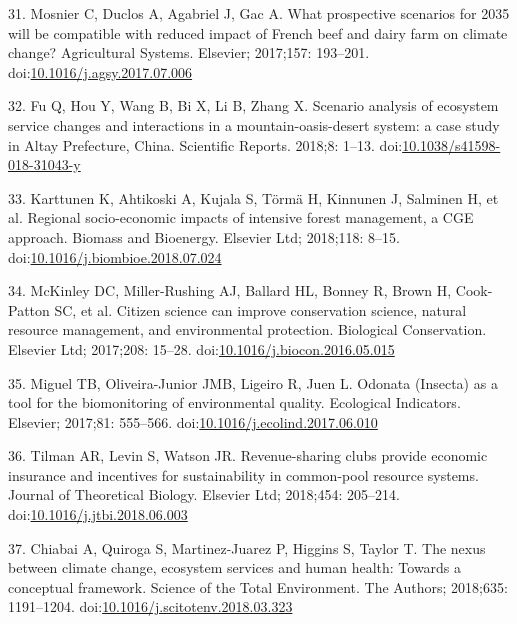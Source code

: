 \documentclass[10pt,letterpaper]{article}
\begin{document}
\hypertarget{ref-Mosnier2017}{}
31. Mosnier C, Duclos A, Agabriel J, Gac A. What prospective scenarios
for 2035 will be compatible with reduced impact of French beef and dairy
farm on climate change? Agricultural Systems. Elsevier; 2017;157:
193--201.
doi:\href{https://doi.org/10.1016/j.agsy.2017.07.006}{10.1016/j.agsy.2017.07.006}

\hypertarget{ref-Fu2018}{}
32. Fu Q, Hou Y, Wang B, Bi X, Li B, Zhang X. Scenario analysis of
ecosystem service changes and interactions in a mountain-oasis-desert
system: a case study in Altay Prefecture, China. Scientific Reports.
2018;8: 1--13.
doi:\href{https://doi.org/10.1038/s41598-018-31043-y}{10.1038/s41598-018-31043-y}

\hypertarget{ref-Karttunen2018}{}
33. Karttunen K, Ahtikoski A, Kujala S, Törmä H, Kinnunen J, Salminen H,
et al. Regional socio-economic impacts of intensive forest management, a
CGE approach. Biomass and Bioenergy. Elsevier Ltd; 2018;118: 8--15.
doi:\href{https://doi.org/10.1016/j.biombioe.2018.07.024}{10.1016/j.biombioe.2018.07.024}

\hypertarget{ref-McKinley2017}{}
34. McKinley DC, Miller-Rushing AJ, Ballard HL, Bonney R, Brown H,
Cook-Patton SC, et al. Citizen science can improve conservation science,
natural resource management, and environmental protection. Biological
Conservation. Elsevier Ltd; 2017;208: 15--28.
doi:\href{https://doi.org/10.1016/j.biocon.2016.05.015}{10.1016/j.biocon.2016.05.015}

\hypertarget{ref-Miguel2017}{}
35. Miguel TB, Oliveira-Junior JMB, Ligeiro R, Juen L. Odonata (Insecta)
as a tool for the biomonitoring of environmental quality. Ecological
Indicators. Elsevier; 2017;81: 555--566.
doi:\href{https://doi.org/10.1016/j.ecolind.2017.06.010}{10.1016/j.ecolind.2017.06.010}

\hypertarget{ref-Tilman2018}{}
36. Tilman AR, Levin S, Watson JR. Revenue-sharing clubs provide
economic insurance and incentives for sustainability in common-pool
resource systems. Journal of Theoretical Biology. Elsevier Ltd;
2018;454: 205--214.
doi:\href{https://doi.org/10.1016/j.jtbi.2018.06.003}{10.1016/j.jtbi.2018.06.003}

\hypertarget{ref-Chiabai2018}{}
37. Chiabai A, Quiroga S, Martinez-Juarez P, Higgins S, Taylor T. The
nexus between climate change, ecosystem services and human health:
Towards a conceptual framework. Science of the Total Environment. The
Authors; 2018;635: 1191--1204.
doi:\href{https://doi.org/10.1016/j.scitotenv.2018.03.323}{10.1016/j.scitotenv.2018.03.323}
\end{document}
